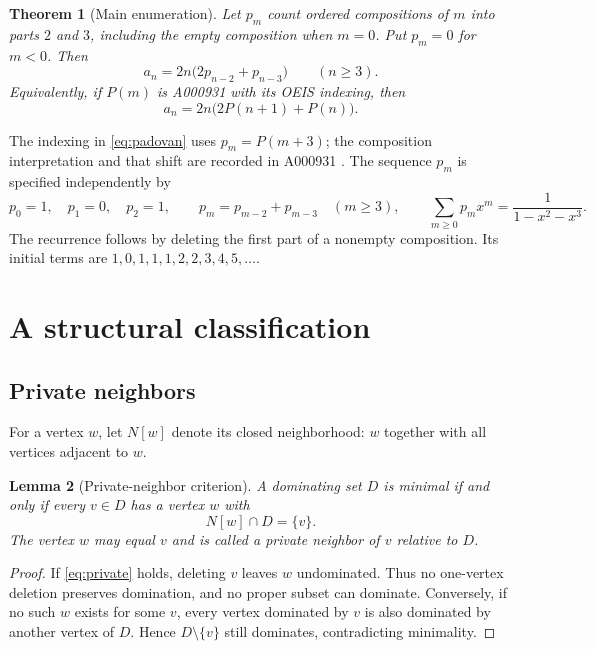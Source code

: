 \documentclass[11pt,letterpaper]{article}
\numberwithin{equation}{section}
\newtheorem{theorem}{Theorem}[section]
\newtheorem{lemma}[theorem]{Lemma}
\theoremstyle{definition}
\newcommand{\1}{\mathbf 1}
\begin{document}
\begin{theorem}[Main enumeration]\label{thm:main}
Let $p_m$ count ordered compositions of $m$ into parts $2$ and $3$, including
the empty composition when $m=0$. Put $p_m=0$ for $m<0$. Then
\begin{equation}\label{eq:main}
 \boxed{a_n=2n\bigl(2p_{n-2}+p_{n-3}\bigr)\qquad(n\ge3).}
\end{equation}
Equivalently, if $P(m)$ is A000931 with its OEIS indexing, then
\begin{equation}\label{eq:padovan}
 a_n=2n\bigl(2P(n+1)+P(n)\bigr).
\end{equation}
\end{theorem}
The indexing in \eqref{eq:padovan} uses $p_m=P(m+3)$; the composition
interpretation and that shift are recorded in A000931 \cite{A000931}.
The sequence $p_m$ is specified independently by
\begin{equation}\label{eq:p}
 p_0=1,\quad p_1=0,\quad p_2=1,\qquad
 p_m=p_{m-2}+p_{m-3}\quad(m\ge3),
 \qquad \sum_{m\ge0}p_mx^m=\frac1{1-x^2-x^3}.
\end{equation}
The recurrence follows by deleting the first part of a nonempty composition.
Its initial terms are $1,0,1,1,1,2,2,3,4,5,\ldots$.

\section{A structural classification}\label{sec:classification}

\subsection{Private neighbors}
For a vertex $w$, let $N[w]$ denote its closed neighborhood: $w$ together with
all vertices adjacent to $w$.
\begin{lemma}[Private-neighbor criterion]\label{lem:private}
A dominating set $D$ is minimal if and only if every $v\in D$ has a vertex $w$
with
\begin{equation}\label{eq:private}
 N[w]\cap D=\{v\}.
\end{equation}
The vertex $w$ may equal $v$ and is called a private neighbor of $v$ relative to $D$.
\end{lemma}
\begin{proof}
If \eqref{eq:private} holds, deleting $v$ leaves $w$ undominated. Thus no
one-vertex deletion preserves domination, and no proper subset can dominate.
Conversely, if no such $w$ exists for some $v$, every vertex dominated by $v$
is also dominated by another vertex of $D$. Hence $D\setminus\{v\}$ still
dominates, contradicting minimality.
\end{proof}
\end{document}
